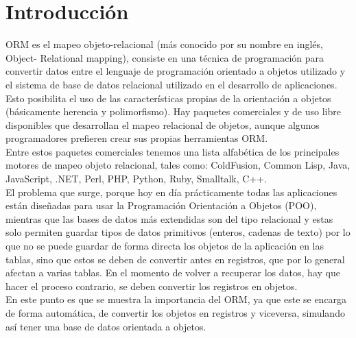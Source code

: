 \section{Introducción} 
\begin{flushright}


\begin{itemize}
ORM es el mapeo objeto-relacional (más conocido por su nombre en inglés, Object- Relational mapping), consiste en una técnica de programación para convertir datos entre el lenguaje de programación orientado a objetos utilizado y el sistema de base de datos relacional utilizado en el desarrollo de aplicaciones. Esto posibilita el uso de las características propias de la orientación a objetos (básicamente herencia y polimorfismo). Hay paquetes comerciales y de uso libre disponibles que desarrollan el mapeo relacional de objetos, aunque algunos programadores prefieren crear sus propias herramientas ORM. \textbf{}\\
Entre estos paquetes comerciales tenemos una lista alfabética de los principales motores de mapeo objeto relacional, tales como: ColdFusion, Common Lisp, Java, JavaScript, .NET, Perl, PHP, Python, Ruby, Smalltalk, C++.\textbf{}\\
El problema que surge, porque hoy en día prácticamente todas las aplicaciones están diseñadas para usar la Programación Orientación a Objetos (POO), mientras que las bases de datos más extendidas son del tipo relacional y estas solo permiten guardar tipos de datos primitivos (enteros, cadenas de texto) por lo que no se puede guardar de forma directa los objetos de la aplicación en las tablas, sino que estos se deben de convertir antes en registros, que por lo general afectan a varias tablas. En el momento de volver a recuperar los datos, hay que hacer el proceso contrario, se deben convertir los registros en objetos. \textbf{}\\
En este punto es que se muestra la importancia del ORM, ya que este se encarga de forma automática, de convertir los objetos en registros y viceversa, simulando así tener una base de datos orientada a objetos.




	


\end{itemize} 


\end{flushright}